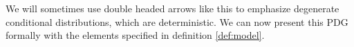 \documentclass{article}
\theoremstyle{plain}
\theoremstyle{definition}
\newenvironment{example}
	{\pushQED{\qed}\renewcommand{\qedsymbol}{$\triangle$}\examplex}
	{\popQED\endexamplex%
}
\theoremstyle{remark}
\numberwithin{equation}{section}
\begin{document}
{\begin{example}
		\begin{center}
		\end{center}
		We will sometimes use double headed arrows like this to emphasize degenerate conditional distributions, which are deterministic.
		We can now present this PDG formally with the elements specified in definition \ref{def:model}.
		

\end{example}}
\end{document}
